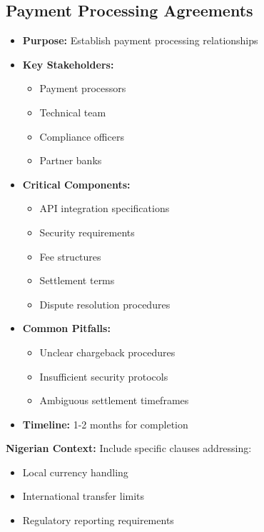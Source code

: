 \subsection{Payment Processing Agreements}
\begin{tcolorbox}[colback=white,colframe=primarydark,title=\textbf{Payment Integration Documentation}]
\begin{itemize}
    \item \textbf{Purpose:} Establish payment processing relationships
    \item \textbf{Key Stakeholders:}
    \begin{itemize}
        \item Payment processors
        \item Technical team
        \item Compliance officers
        \item Partner banks
    \end{itemize}
    \item \textbf{Critical Components:}
    \begin{itemize}
        \item API integration specifications
        \item Security requirements
        \item Fee structures
        \item Settlement terms
        \item Dispute resolution procedures
    \end{itemize}
    \item \textbf{Common Pitfalls:}
    \begin{itemize}
        \item Unclear chargeback procedures
        \item Insufficient security protocols
        \item Ambiguous settlement timeframes
    \end{itemize}
    \item \textbf{Timeline:} 1-2 months for completion
\end{itemize}

\textbf{Nigerian Context:}
Include specific clauses addressing:
\begin{itemize}
    \item Local currency handling
    \item International transfer limits
    \item Regulatory reporting requirements
\end{itemize}
\end{tcolorbox}

